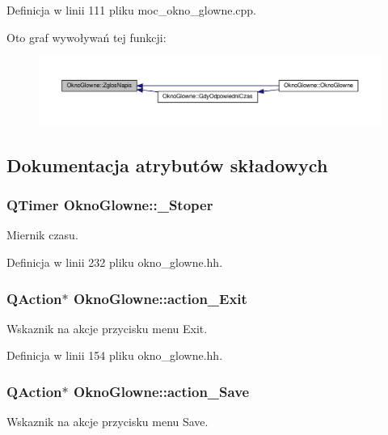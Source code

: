 Definicja w linii 111 pliku moc\-\_\-okno\-\_\-glowne.\-cpp.



Oto graf wywoływań tej funkcji\-:
\nopagebreak
\begin{figure}[H]
\begin{center}
\leavevmode
\includegraphics[width=350pt]{class_okno_glowne_aa602a0c5a940f0af4ab7390bfc1a4b9d_icgraph}
\end{center}
\end{figure}




\subsection{Dokumentacja atrybutów składowych}
\hypertarget{class_okno_glowne_a5d047f90666212f58e69d11af3285d9b}{
\subsubsection[{\-\_\-\-Stoper}]{\setlength{\rightskip}{0pt plus 5cm}Q\-Timer Okno\-Glowne\-::\-\_\-\-Stoper\hspace{0.3cm}{\ttfamily [private]}}}\label{class_okno_glowne_a5d047f90666212f58e69d11af3285d9b}
Miernik czasu. 

Definicja w linii 232 pliku okno\-\_\-glowne.\-hh.

\hypertarget{class_okno_glowne_a579ef9901f57057368cb522ea5a9a5c3}{
\subsubsection[{action\-\_\-\-Exit}]{\setlength{\rightskip}{0pt plus 5cm}Q\-Action$\ast$ Okno\-Glowne\-::action\-\_\-\-Exit}}\label{class_okno_glowne_a579ef9901f57057368cb522ea5a9a5c3}
Wskaznik na akcje przycisku menu Exit. 

Definicja w linii 154 pliku okno\-\_\-glowne.\-hh.

\hypertarget{class_okno_glowne_a2c2d825b6e5e0faa5eb368be4fc73b78}{
\subsubsection[{action\-\_\-\-Save}]{\setlength{\rightskip}{0pt plus 5cm}Q\-Action$\ast$ Okno\-Glowne\-::action\-\_\-\-Save}}\label{class_okno_glowne_a2c2d825b6e5e0faa5eb368be4fc73b78}
Wskaznik na akcje przycisku menu Save. 

